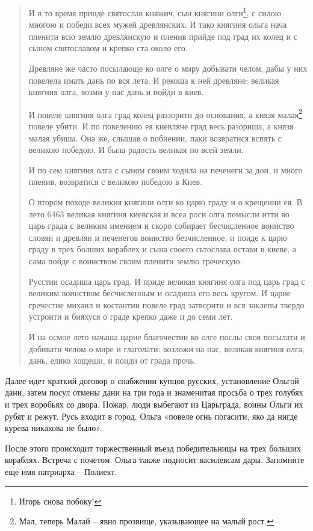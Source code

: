 \begin{quotation}
И в то время прииде святослав княжич, сын княгини олги\footnote{Игорь снова побоку!}, с силою многою и победи всех мужей древлянских. И тако княгиня ольга нача пленити всю землю древлянскую и пленив прийде под град их колец и с сыном святославом и крепко ста около его. 

Древляне же часто посылающе ко олге о миру добывати челом, дабы у них повелела имать дань по вся лета. И рекоша к ней древляне: великая княгиня олга, возми у нас дань и пойди в киев.

И повеле княгиня олга град колец раззорити до основания, а князя малая\footnote{Мал, теперь Малай – явно прозвище, указывающее на малый рост.} повеле убити. И по повелению ея киевляне град весь разориша, а князя малая убиша. Она же, слышав о побиении, паки возвратися вспять с великою победою. И была радость великая по всей земли.

И по сем княгиня олга с сыном своим ходила на печенеги за дон, и много пленив, возвратися с великою победою в Киев.

О втором походе великия княгини олги ко царю граду и о крещении ея. В лето 6463 великая княгиня киевская и всеа роси олга помысли итти во царь града с великим имением и скоро собирает бесчисленное воинство словян и древлян и печенегов воинство безчисленное, и поиде к царю граду в трех болших кораблех и сына своего сьтослава остави в киеве, а сама пойде с воинством своим пленити землю греческую.

Русстии осадиша царь град. И приде великая княгиня олга под царь град с великим воинством бесчисленным и осадиша его весь кругом. И царие гречестие михаил и костантин повеле град затворити и вся заклепы твердо устроити и бияхуся о граде крепко даже и до семи лет.

И на осмое лето начаша царие благочестии ко олге послы своя посылати и добивати челом о мире и глаголати: возложи на нас, великая княгиня олга, дань, елико хощеши, и поиди от града прочь.
\end{quotation}

Далее идет краткий договор о снабжении купцов русских, установление Ольгой дани, затем посул отмены дани на три года и знаменитая просьба о трех голубях и трех воробьях со двора. Пожар, люди выбегают из Царьграда, воины Ольги их рубят и режут. Русь входит в город. Ольга «повеле огнь погасити, яко да нигде курева никакова не было».

После этого происходит торжественный въезд победительницы на трех больших кораблях. Встреча с почетом. Ольга также подносит василевсам дары. Запомните еще имя патриарха – Полиект.

